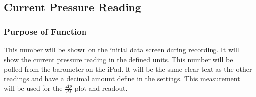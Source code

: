 \documentclass[onecolumn, draftclsnofoot,10pt, compsoc]{IEEEtran}
\begin{document}
%

\subsection{Current Pressure Reading}
\subsubsection{Purpose of Function}
This number will be shown on the initial data screen during recording.
It will show the current pressure reading in the defined units.
This number will be polled from the barometer on the iPad.
It will be the same clear text as the other readings and have a decimal amount define in the settings.
This measurement will be used for the $\frac{\Delta p}{\Delta t}$ plot and readout.
\end{document}

